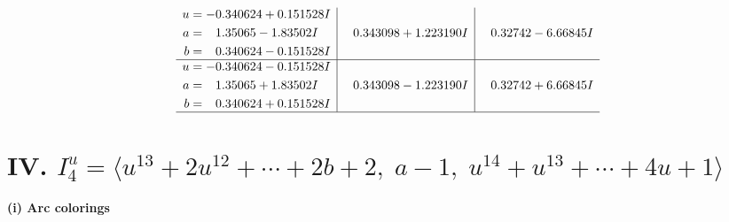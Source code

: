 \documentclass[1p]{elsarticle_modified}
\theoremstyle{definition}
\begin{document}
$$\begin{array}{c|c|c}
\begin{aligned}
u &= -0.340624 + 0.151528 I \\
a &= \phantom{-}1.35065 - 1.83502 I \\
b &= \phantom{-}0.340624 - 0.151528 I\end{aligned}
 & \phantom{-}0.343098 + 1.223190 I & \phantom{-}0.32742 - 6.66845 I \\ \hline\begin{aligned}
u &= -0.340624 - 0.151528 I \\
a &= \phantom{-}1.35065 + 1.83502 I \\
b &= \phantom{-}0.340624 + 0.151528 I\end{aligned}
 & \phantom{-}0.343098 - 1.223190 I & \phantom{-}0.32742 + 6.66845 I\\
 \hline 
 \end{array}$$\newpage\newpage\renewcommand{\arraystretch}{1}
\centering \section*{IV. $I^u_{4}= \langle u^{13}+2 u^{12}+\cdots+2 b+2,\;a-1,\;u^{14}+u^{13}+\cdots+4 u+1 \rangle$}
\flushleft \textbf{(i) Arc colorings}\\
\end{document}
